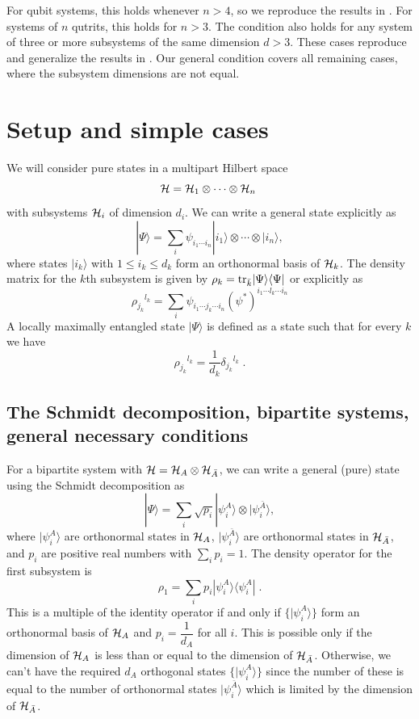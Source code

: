 \documentclass[12pt]{article}
\theoremstyle{definition}
\newcommand{\be}{\begin{equation}}
\newcommand{\ee}{\end{equation}}
\newcommand{\tr}{{\rm tr}}
\begin{document}
For qubit systems, this holds whenever $n>4$, so we reproduce the results in \cite{GKW}. For systems of $n$ qutrits, this holds for $n > 3$. The condition also holds for any system of three or more subsystems of the same dimension $d > 3$. These cases reproduce and generalize the results in \cite{SWGK}. Our general condition covers all remaining cases, where the subsystem dimensions are not equal.


\section{Setup and simple cases}

We will consider pure states in a multipart Hilbert space
\[
{\cal H} = {\cal H}_{1}  \otimes \cdots  \otimes {\cal H}_{n} \;  
\]
with subsystems ${\cal H}_i$ of dimension $d_i$. We can write a general state explicitly as
\be
|\Psi \rangle = \sum_i \psi_{i_1 \cdots i_n} |i_1 \rangle  \otimes \cdots  \otimes |i_n \rangle,
\ee
where states $|i_k \rangle$ with $1 \le i_k \le d_k$ form an orthonormal basis of ${\cal H}_k$. The density matrix for the $k$th subsystem is given by $\rho_k = \tr_{\bar{k}} | \Psi \rangle \langle \Psi |$ or explicitly as
\be
\rho_{j_k} {}^{l_k} = \sum_{i}  \psi_{i_1 \cdots j_k \cdots i_n}(\psi^*)^{i_1 \cdots l_k \cdots i_n}
\ee
A locally maximally entangled state $|\Psi \rangle$ is defined as a state such that for every $k$ we have
\be
\rho_{j_k} {}^{l_k} = \frac{1}{d_k} \delta_{j_k} {}^{l_k} \; .
\ee

\subsection{The Schmidt decomposition, bipartite systems, general necessary conditions}

For a bipartite system with ${\cal H} = {\cal H}_A  \otimes {\cal H}_{\bar{A}}$, we can write a general (pure) state using the Schmidt decomposition as
\be
|\Psi \rangle = \sum_i \sqrt{p_i} |\psi_i^A \rangle  \otimes |\psi_i^{\bar{A}} \rangle,
\ee
where $|\psi_i^A\rangle$ are orthonormal states in ${\cal H}_A$, $|\psi_i^{\bar{A}} \rangle$ are orthonormal states in ${\cal H}_{\bar{A}}$, and $p_i$ are positive real numbers with $\sum_i p_i = 1$. The density operator for the first subsystem is
\be
\rho_1 = \sum_i p_i |\psi_i^A \rangle \langle \psi_i^A| \; .
\ee
This is a multiple of the identity operator if and only if $\{|\psi_i^A \rangle\}$ form an orthonormal basis of ${\cal H}_A$ and $p_i = \dfrac{1}{ d_A}$ for all $i$. This is possible only if the dimension of ${\cal H}_A$ is less than or equal to the dimension of ${\cal H}_{\bar{A}}$. Otherwise, we can't have the required $d_A$ orthogonal states $\{|\psi_i^A \rangle\}$ since the number of these is equal to the number of orthonormal states $|\psi_i^{\bar{A}} \rangle$ which is limited by the dimension of ${\cal H}_{\bar{A}}$.
\end{document}
